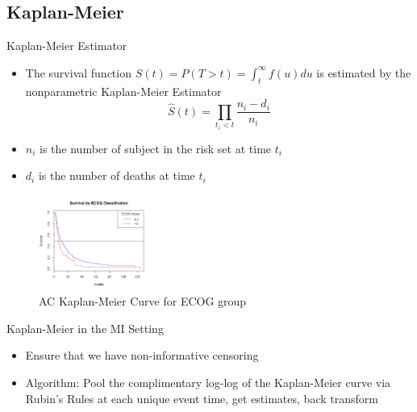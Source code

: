 \subsection{Kaplan-Meier}
\begin{frame}{Kaplan-Meier Estimator}
\begin{itemize}
 \item The survival function $S(t)=P(T>t)=\int_{t}^{\infty}f(u)du$ is estimated by the 
 nonparametric Kaplan-Meier Estimator
 $$\hat{S}(t)=\prod_{t_i<t}\frac{n_i -d_i}{n_i}$$
\item $n_i$ is the number of subject in the risk set at time $t_i$
\item $d_i$ is the number of deaths at time $t_i$
\end{itemize}
 \begin{figure}[h!]
  \centering
    \includegraphics[width=0.33\textwidth]{ecog_km.png}
  \caption{AC Kaplan-Meier Curve for ECOG group}
\label{fig:KMcurve}
\end{figure}
\end{frame}




\begin{frame}{Kaplan-Meier in the MI Setting}
 \begin{itemize}
  \item Ensure that we have non-informative censoring
\item Algorithm: Pool the complimentary log-log of the Kaplan-Meier curve via Rubin's Rules at
each unique event time, get estimates,
back transform \cite{Marshall2009}
 \end{itemize}
\end{frame}



